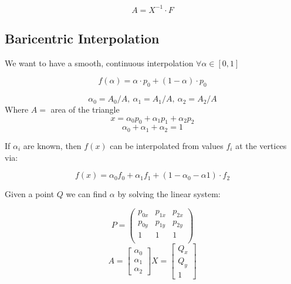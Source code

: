 $$A = X^{-1} \cdot F$$

\subsection{Baricentric Interpolation}

We want to have a smooth, continuous interpolation $\forall \alpha \in [0, 1]$

$$f(\alpha) = \alpha \cdot p_0 + (1 - \alpha) \cdot p_0$$

\begin{center}
\end{center}

$$\alpha_0 = A_0 / A , \ \alpha_1 = A_1 / A , \ \alpha_2 = A_2 / A$$
Where $A =$ area of the triangle
$$x = \alpha_0 p_0 + \alpha_1 p_1 + \alpha_2 p_2$$
$$\alpha_0 + \alpha_1 + \alpha_2 = 1$$

If $\alpha_i$ are known, then $f(x)$ can be interpolated from values $f_i$ at the vertices via:

$$f(x) = \alpha_0 f_0 + \alpha_1 f_1 + (1 - \alpha_0 - \alpha1) \cdot f_2$$

Given a point $Q$ we can find $\alpha$ by solving the linear system:

$$P = \begin{pmatrix}
    p_{0x} & p_{1x} & p_{2x} \\
    p_{0y} & p_{1y} & p_{2y} \\
    1 & 1 & 1 \\
\end{pmatrix}$$
$$A = \begin{bmatrix}
    \alpha_0 \\ \alpha_1 \\ \alpha_2
\end{bmatrix} X = \begin{bmatrix}
    Q_x \\ Q_y \\ 1
\end{bmatrix}$$

